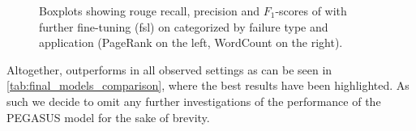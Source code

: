 \begin{figure}[htbp]
\centering
{}%
\hfill{}%
%
\hfill{}%
\caption[Boxplots showing \acs*{rouge} recall, precision and \(F_1\)-scores
of  with further fine-tuning (\acs*{fsl}) on \hadoop{} categorized by failure type and application.]{Boxplots showing \acs*{rouge} recall, precision and \(F_1\)-scores
of  with further fine-tuning (\acs*{fsl}) on \hadoop{} categorized by failure type and application (PageRank on the left, WordCount on the right).}
\label{fig:pegasus_large_fsl_hadoop}
\end{figure}

Altogether,
 outperforms  in all observed settings as can be seen in \autoref{tab:final_models_comparison},
where the best results have been highlighted.
As such we decide to omit any further investigations of the performance of the PEGASUS model for the sake of brevity.

